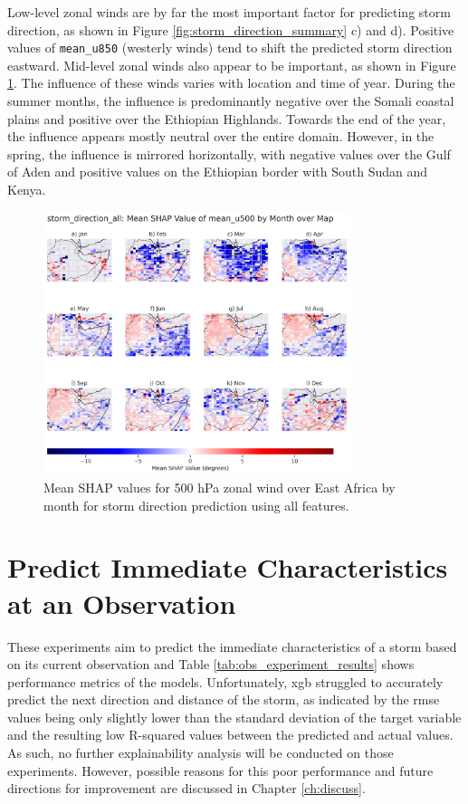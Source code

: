 Low-level zonal winds are by far the most important factor for predicting storm direction, as shown in Figure \ref{fig:storm_direction_summary} c) and d). Positive values of \texttt{mean\_u850} (westerly winds) tend to shift the predicted storm direction eastward. Mid-level zonal winds also appear to be important, as shown in Figure \ref{fig:storm_direction_all_shap_mean_u500_map_by_month}. The influence of these winds varies with location and time of year. During the summer months, the influence is predominantly negative over the Somali coastal plains and positive over the Ethiopian Highlands. Towards the end of the year, the influence appears mostly neutral over the entire domain. However, in the spring, the influence is mirrored horizontally, with negative values over the Gulf of Aden and positive values on the Ethiopian border with South Sudan and Kenya.

\begin{figure}[ht]
    \centering
    \includegraphics[width=0.8\textwidth]{../figures/generated/experiments/storm_direction/geographic_corr/storm_direction_all_shap_mean_u500_map_by_month.png}
    \caption{Mean SHAP values for 500 hPa zonal wind over East Africa by month for storm direction prediction using all features.}
    \label{fig:storm_direction_all_shap_mean_u500_map_by_month}
\end{figure}

\clearpage
\section{Predict Immediate Characteristics at an Observation}

These experiments aim to predict the immediate characteristics of a storm based on its current observation and Table \ref{tab:obs_experiment_results} shows performance metrics of the models. Unfortunately, \acrshort{xgb} struggled to accurately predict the next direction and distance of the storm, as indicated by the \acrshort{rmse} values being only slightly lower than the standard deviation of the target variable and the resulting low R-squared values between the predicted and actual values. As such, no further explainability analysis will be conducted on those experiments. However, possible reasons for this poor performance and future directions for improvement are discussed in Chapter \ref{ch:discuss}.

